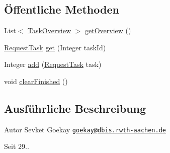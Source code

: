\subsection*{Öffentliche Methoden}
\begin{DoxyCompactItemize}
\item 
List$<$ \hyperlink{classde_1_1rwth_1_1idsg_1_1steve_1_1repository_1_1dto_1_1_task_overview}{Task\+Overview} $>$ \hyperlink{classde_1_1rwth_1_1idsg_1_1steve_1_1repository_1_1impl_1_1_request_task_store_impl_afd8239a9c6be044a344a1e99b3ab0156}{get\+Overview} ()
\item 
\hyperlink{classde_1_1rwth_1_1idsg_1_1steve_1_1web_1_1dto_1_1task_1_1_request_task}{Request\+Task} \hyperlink{classde_1_1rwth_1_1idsg_1_1steve_1_1repository_1_1impl_1_1_request_task_store_impl_afae9b820ad70b8bdabea36ed025d1a50}{get} (Integer task\+Id)
\item 
Integer \hyperlink{classde_1_1rwth_1_1idsg_1_1steve_1_1repository_1_1impl_1_1_request_task_store_impl_ab0037e5f63adb2663329682368c527a5}{add} (\hyperlink{classde_1_1rwth_1_1idsg_1_1steve_1_1web_1_1dto_1_1task_1_1_request_task}{Request\+Task} task)
\item 
void \hyperlink{classde_1_1rwth_1_1idsg_1_1steve_1_1repository_1_1impl_1_1_request_task_store_impl_ac9279a591b9e553475d673d480aa6e6f}{clear\+Finished} ()
\end{DoxyCompactItemize}


\subsection{Ausführliche Beschreibung}
\begin{DoxyAuthor}{Autor}
Sevket Goekay \href{mailto:goekay@dbis.rwth-aachen.de}{\tt goekay@dbis.\+rwth-\/aachen.\+de} 
\end{DoxyAuthor}
\begin{DoxySince}{Seit}
29.. 
\end{DoxySince}


